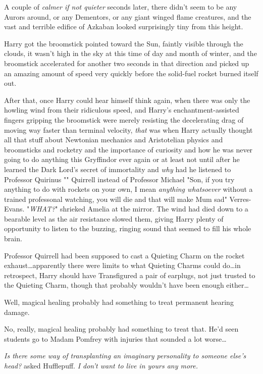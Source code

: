 A couple of \emph{calmer if not quieter} seconds later, there didn’t seem to be
any Aurors around, or any Dementors, or any giant winged flame creatures, and
the vast and terrible edifice of Azkaban looked surprisingly tiny from this
height.

Harry got the broomstick pointed toward the Sun, faintly visible through the
clouds, it wasn’t high in the sky at this time of day and month of winter, and
the broomstick accelerated for another two seconds in that direction and picked
up an amazing amount of speed very quickly before the solid-fuel rocket burned
itself out.

After that, once Harry could hear himself think again, when there was only the
howling wind from their ridiculous speed, and Harry’s enchantment-assisted
fingers gripping the broomstick were merely resisting the decelerating drag of
moving way faster than terminal velocity, \emph{that} was when Harry actually
thought all that stuff about Newtonian mechanics and Aristotelian physics and
broomsticks and rocketry and the importance of curiosity and how he was never
going to do anything this Gryffindor ever again or at least not until after he
learned the Dark Lord’s secret of immortality and \emph{why} had he listened to
Professor Quirinus "" Quirrell instead of Professor Michael
"Son, if you try anything to do with rockets on your own, I mean \emph{anything
whatsoever} without a trained professonal watching, you will die and that will
make Mum sad" Verres-Evans.
\later
"\emph{WHAT?}" shrieked Amelia at the mirror.
\later
The wind had died down to a bearable level as the air resistance slowed them,
giving Harry plenty of opportunity to listen to the buzzing, ringing sound that
seemed to fill his whole brain.

Professor Quirrell had been supposed to cast a Quieting Charm on the rocket
exhaust…apparently there were limits to what Quieting Charms could
do…in retrospect, Harry should have Transfigured a pair of earplugs,
not just trusted to the Quieting Charm, though that probably wouldn’t have been
enough either…

Well, magical healing probably had something to treat permanent hearing damage.

No, really, magical healing probably had something to treat that. He’d seen
students go to Madam Pomfrey with injuries that sounded a lot worse…

\emph{Is there some way of transplanting an imaginary personality to someone
else’s head?} asked Hufflepuff. \emph{I don’t want to live in yours any more.}

